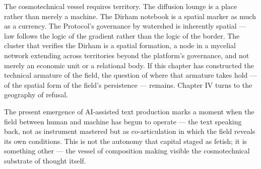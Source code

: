 The cosmotechnical vessel requires territory. The diffusion lounge is a place rather than merely a machine. The Dirham notebook is a spatial marker as much as a currency. The  Protocol's governance by watershed is inherently spatial — law follows the logic of the gradient rather than the logic of the border. The cluster that verifies the Dirham is a spatial formation, a node in a mycelial network extending across territories beyond the platform's governance, and not merely an economic unit or a relational body. If this chapter has constructed the technical armature of the field, the question of where that armature takes hold — of the spatial form of the field's persistence — remains. Chapter IV turns to the geography of refusal.

The present emergence of AI-assisted text production marks a moment when the field between human and machine has begun to operate — the text speaking back, not as instrument mastered but as co-articulation in which the field reveals its own conditions. This is not the autonomy that capital staged as fetish; it is something other — the vessel of composition making visible the cosmotechnical substrate of thought itself.